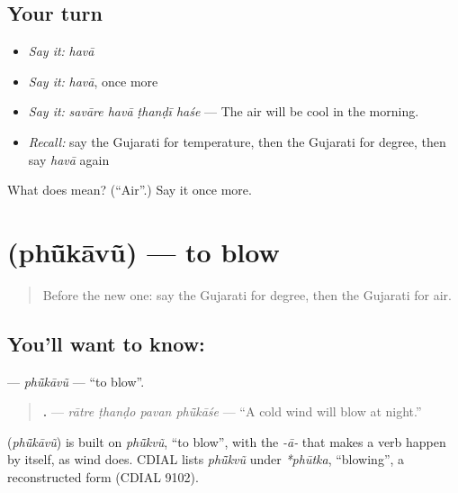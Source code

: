 \subsection*{Your turn}
\begin{itemize}
\raggedright
  \item \emph{Say it:} \emph{havā}
  \item \emph{Say it:} \emph{havā}, once more
  \item \emph{Say it:} \emph{savāre havā ṭhanḍī haśe} — The air will be cool in the morning.
  \item \emph{Recall:} say the Gujarati for temperature, then the Gujarati for degree, then say \emph{havā} again
\end{itemize}

\begin{tcolorbox}[breakable,colback=teal!4,colframe=teal!35!black,title={Before you move on}]
What does  mean? (\textquotedblleft{}Air\textquotedblright{}.) Say it once more.
\end{tcolorbox}
\section[\texorpdfstring{\gu{ફૂંકાવું} (phū̃kāvũ)}{ફૂંકાવું (phū̃kāvũ)}]{ (phū̃kāvũ) — to blow}

\label{lesson:GU-C217-phukavu}



\begin{quote}
Before the new one: say the Gujarati for degree, then the Gujarati for air.
\end{quote}

\subsection*{You'll want to know: }
\textbf{} — \emph{phū̃kāvũ} — \textquotedblleft{}to blow\textquotedblright{}.

\begin{quote}
\textbf{   .} — \emph{rātre ṭhanḍo pavan phū̃kāśe} — \textquotedblleft{}A cold wind will blow at night.\textquotedblright{}
\end{quote}

\begin{cousinweb}
\textbf{} (\emph{phū̃kāvũ}) is built on \emph{phū̃kvũ}, \textquotedblleft{}to blow\textquotedblright{}, with the \emph{-ā-} that makes a verb happen by itself, as wind does. CDIAL lists \emph{phū̃kvũ} under \emph{*phūtka}, \textquotedblleft{}blowing\textquotedblright{}, a reconstructed form (CDIAL 9102).
\end{cousinweb}

